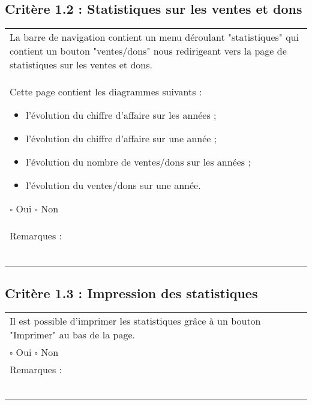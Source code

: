 	\subsection*{Critère 1.2 : Statistiques sur les ventes et dons}
	
		\begin{center}
    	 		\begin{tabular}[h]{|p{}|}
			\hline La barre de navigation contient un menu déroulant "statistiques" qui contient un bouton "ventes/dons" nous redirigeant vers la page de statistiques sur les ventes et dons.\\
Cette page contient les diagrammes suivants :
		\begin{itemize}
			\item l'évolution du chiffre d'affaire sur les années ;
			\item l'évolution du chiffre d'affaire sur une année ;
			\item l'évolution du nombre de ventes/dons sur les années ;
			\item l'évolution du ventes/dons sur une année.
		\end{itemize}
				
				$\square$ Oui \hfill \hfill $\square$ Non \\\hline Remarques : \\ ~\\
			 \\\hline
     		\end{tabular}
  		\end{center}	
  		
  	\subsection*{Critère 1.3 : Impression des statistiques}
	
		\begin{center}
    	 		\begin{tabular}[h]{|p{}|}
			\hline Il est possible d'imprimer les statistiques grâce à un bouton "Imprimer" au bas de la page.
			\\
				
				$\square$ Oui \hfill \hfill $\square$ Non \\\hline Remarques : \\ ~\\
			 \\\hline
     		\end{tabular}
  		\end{center}	
